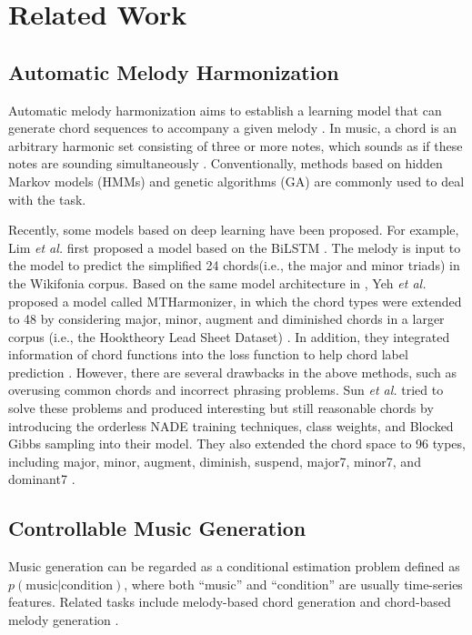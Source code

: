 \documentclass{article}
\begin{document}
\section{Related Work}

\subsection{Automatic Melody Harmonization}

Automatic melody harmonization aims to establish a learning model that can generate chord sequences to accompany a given melody \cite{Chuan2007,Simon2008}. In music, a chord is an arbitrary harmonic set consisting of three or more notes, which sounds as if these notes are sounding simultaneously \cite{Makris2016}. Conventionally, methods based on hidden Markov models (HMMs) \cite{Paiement2006,Tsushima2017,Tsushima2018} and genetic algorithms (GA) \cite{Kitahara2018} are commonly used to deal with the task.

Recently, some models based on deep learning have been proposed. For example, Lim \textit{et al.} first proposed a model based on the BiLSTM \cite{Lim2017}. The melody is input to the model to predict the simplified 24 chords(i.e., the major and minor triads) in the Wikifonia corpus. Based on the same model architecture in \cite{Lim2017}, Yeh \textit{et al.} proposed a model called MTHarmonizer, in which the chord types were extended to 48 by considering major, minor, augment and diminished chords in a larger corpus (i.e., the Hooktheory Lead Sheet Dataset) \cite{Yeh2020}. In addition, they integrated information of chord functions \cite{Chen2018} into the loss function to help chord label prediction \cite{Yeh2020}. However, there are several drawbacks in the above methods, such as overusing common chords and incorrect phrasing problems. Sun \textit{et al.} tried to solve these problems and produced interesting but still reasonable chords by introducing the orderless NADE training techniques, class weights, and Blocked Gibbs sampling into their model. They also extended the chord space to 96 types, including major, minor, augment, diminish, suspend, major7, minor7, and dominant7 \cite{Sun2020}.

\subsection{Controllable Music Generation}

Music generation can be regarded as a conditional estimation problem defined as $p(\text{music}|\text{condition})$, where both ``music'' and ``condition'' are usually time-series features. Related tasks include melody-based chord generation \cite{Simon2008} and chord-based melody generation \cite{Yang2017,Chen2018}. 
\end{document}
